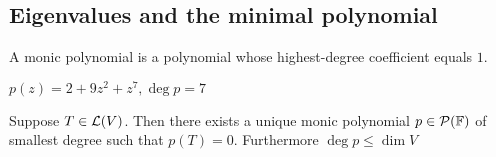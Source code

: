 \subsection{Eigenvalues and the minimal polynomial}
\begin{mydef}
    A monic polynomial is a polynomial whose highest-degree coefficient equals $1$.
\end{mydef}
\begin{example}
    $p(z)=2+9z^2+z^7, \deg p = 7$
\end{example}

\begin{thm}
    \label{unique-monic-polynomial-of-smallest-degree}
    Suppose $T\in \mathcal{L}(V)$. Then there exists a unique monic polynomial $p\in \mathcal{P}(\mathbb{F})$ of smallest degree such that $p(T)=0$. Furthermore $\deg p \leq \dim V$
\end{thm}
